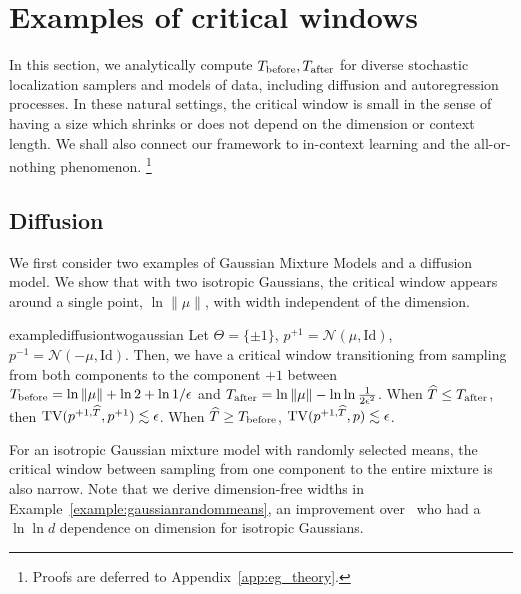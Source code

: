 \section{Examples of critical windows}\label{sec:eg_theory}
In this section, we analytically compute $T_{\mathrm{before}}, T_{\mathrm{after}}$ for diverse stochastic localization samplers and models of data, including diffusion and autoregression processes. In these natural settings, the critical window is small in the sense of having a size which shrinks or does not depend on the dimension or context length. We shall also connect our framework to in-context learning and the all-or-nothing phenomenon. \footnote{Proofs are deferred to Appendix~\ref{app:eg_theory}.}

\subsection{Diffusion}
We first consider two examples of Gaussian Mixture Models and a diffusion model. We show that with two isotropic Gaussians, the critical window appears around a single point, $\ln \|\mu\|$, with width independent of the dimension.

\begin{restatable}{example}{diffusiontwogaussian}\label{ex:twogmm}  Let $\Theta=\{\pm 1\}$, $p^{+1} = \mathcal{N}(\mu,\mathrm{Id})$, $p^{-1} = \mathcal{N}(-\mu,\mathrm{Id})$. Then, we have a critical window transitioning from sampling from both components to the component $+1$ between $T_{\mathrm{before}} = \ln \|\mu\| +\ln 2 + \ln 1/\epsilon$ and $T_{\mathrm{after}} = \ln \|\mu\| -\ln \ln \frac{1}{2 \epsilon^2}$. When $\widehat{T} \leq T_{\mathrm{after}}$, then $\TV(\modrevlaw{+1}{\wh{T}}{},p^{+1}) \lesssim \epsilon$. When $\widehat{T} \geq T_{\mathrm{before}}$, $\TV(\modrevlaw{+1}{\wh{T}}{},p)\lesssim \epsilon$. 
\end{restatable}


\noindent For an isotropic Gaussian mixture model with randomly selected means, the critical window between sampling from one component to the entire mixture is also narrow. Note that we derive dimension-free widths in Example~\ref{example:gaussianrandommeans}, an improvement over~\citep{li2024criticalwindowsnonasymptotictheory} who had a $\ln \ln d$ dependence on dimension for isotropic Gaussians.

